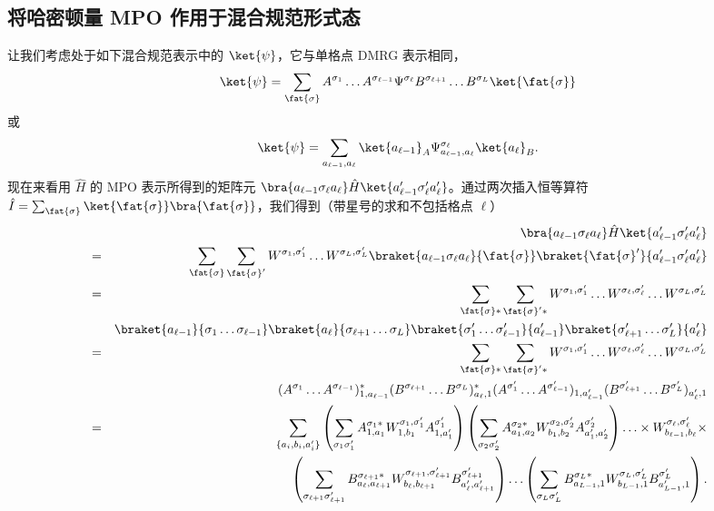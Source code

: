 \subsection{将哈密顿量 MPO 作用于混合规范形式态}
\label{subsec:Hamiltonianmixedcanonical}
让我们考虑处于如下混合规范表示中的 $\ket{\psi}$，它与单格点 DMRG 表示相同，
\begin{equation}
\ket{\psi} = \sum_{\fat{\sigma}} A^{\sigma_1} \ldots A^{\sigma_{\ell-1}} \Psi^{\sigma_{\ell}} B^{\sigma_{\ell+1}} \ldots B^{\sigma_L} \ket{\fat{\sigma}} 
\end{equation}
或
\begin{equation}
\ket{\psi} = \sum_{a_{\ell-1},a_{\ell}} \ket{a_{\ell-1}}_A \Psi^{\sigma_{\ell}}_{a_{\ell-1}, a_{\ell}} \ket{a_{\ell}}_B .
\end{equation}
现在来看用 $\hat{H}$ 的 MPO 表示所得到的矩阵元 $\bra{a_{\ell-1} \sigma_{\ell} a_{\ell}} \hat{H}  \ket{a'_{\ell-1} \sigma'_{\ell} a'_{\ell}}$。通过两次插入恒等算符 $\hat{I} = \sum_{\fat{\sigma}} \ket{\fat{\sigma}}\bra{\fat{\sigma}}$，我们得到（带星号的求和不包括格点 $\ell$）
\begin{eqnarray*}
& & \bra{a_{\ell-1} \sigma_{\ell} a_{\ell}} \hat{H}  \ket{a'_{\ell-1} \sigma'_{\ell} a'_{\ell}} \\
&=& \sum_{\fat{\sigma}} \sum_{\fat{\sigma}'} W^{\sigma_1,\sigma'_1} \ldots W^{\sigma_L,\sigma'_L} 
\braket{a_{\ell-1} \sigma_{\ell} a_{\ell}}{\fat{\sigma}} \braket{\fat{\sigma}'}{a'_{\ell-1} \sigma'_{\ell} a'_{\ell}} \\
&=& \sum_{\fat{\sigma}*}\sum_{\fat{\sigma}'*} W^{\sigma_1,\sigma'_1} \ldots W^{\sigma_{\ell},\sigma'_{\ell}} \ldots W^{\sigma_L,\sigma'_L} \\
& & \braket{a_{\ell-1}}{\sigma_1 \ldots \sigma_{\ell-1}} 
\braket{a_{\ell}}{\sigma_{\ell+1} \ldots \sigma_L}  \braket{\sigma'_1 \ldots \sigma'_{\ell-1}}{a'_{\ell-1}}
\braket{\sigma'_{\ell+1} \ldots \sigma'_L}{a'_{\ell}} \\
&=& \sum_{\fat{\sigma}*}\sum_{\fat{\sigma}'*} W^{\sigma_1,\sigma'_1} \ldots W^{\sigma_{\ell},\sigma'_{\ell}} \ldots W^{\sigma_L,\sigma'_L} \\
& & (A^{\sigma_1} \ldots A^{\sigma_{\ell-1}})^*_{1,a_{\ell-1}} (B^{\sigma_{\ell+1}} \ldots B^{\sigma_L})^*_{a_{\ell},1} (A^{\sigma'_1} \ldots A^{\sigma'_{\ell-1}})_{1,a'_{\ell-1}} (B^{\sigma'_{\ell+1}} \ldots B^{\sigma'_L})_{a'_{\ell},1} \\
&=& \sum_{\{ a_i, b_i, a'_i\} } \left( \sum_{\sigma_1\sigma'_1} A^{\sigma_1*}_{1,a_1} W^{\sigma_1,\sigma'_1}_{1,b_1} A^{\sigma'_1}_{1,a'_1} \right) \left( \sum_{\sigma_2\sigma'_2} A^{\sigma_2*}_{a_1,a_2} W^{\sigma_2,\sigma'_2}_{b_1,b_2} A^{\sigma'_2}_{a'_1,a'_2} \right) \ldots 
\times W^{\sigma_{\ell},\sigma'_{\ell}}_{b_{\ell-1},b_{\ell}} \times \\
& &  \left( \sum_{\sigma_{\ell+1}\sigma'_{\ell+1}} B^{\sigma_{\ell+1}*}_{a_{\ell},a_{\ell+1}} W^{\sigma_{\ell+1},\sigma'_{\ell+1}}_{b_{\ell},b_{\ell+1}} B^{\sigma'_{\ell+1}}_{a'_{\ell},a'_{\ell+1}} \right) \ldots \left( \sum_{\sigma_L\sigma'_L} B^{\sigma_L*}_{a_{L-1},1} W^{\sigma_L,\sigma'_L}_{b_{L-1},1} B^{\sigma'_L}_{a'_{L-1},1} \right) .
\end{eqnarray*}   
